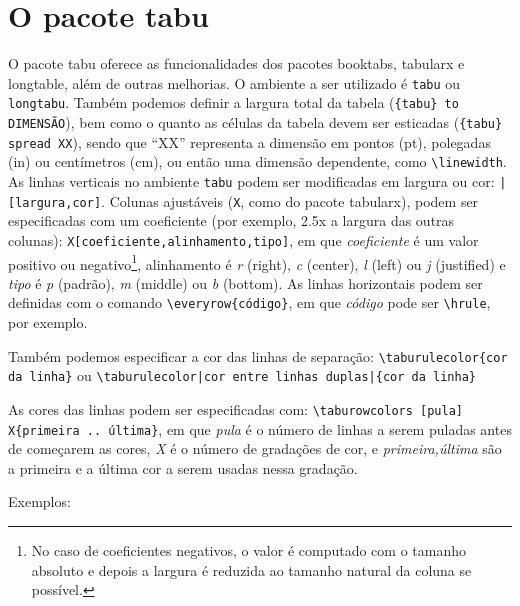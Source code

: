 \documentclass{article}
\begin{document}
\section{O pacote \textsf{tabu}}
\label{sec:tabu}

O pacote \textsf{tabu} oferece as funcionalidades dos pacotes \textsf{booktabs}, \textsf{tabularx} e \textsf{longtable}, além de outras melhorias. O ambiente a ser utilizado é \texttt{tabu} ou \texttt{longtabu}. Também podemos definir a largura total da tabela (\verb+{tabu} to DIMENSÃO+), bem como o quanto as células da tabela devem ser esticadas (\verb+{tabu} spread XX+), sendo que ``XX'' representa a dimensão em pontos (pt), polegadas (in) ou centímetros (cm), ou então uma dimensão dependente, como \verb+\linewidth+. As linhas verticais no ambiente \texttt{tabu} podem ser modificadas em largura ou cor: \verb+|[largura,cor]+. Colunas ajustáveis (\texttt{X}, como do pacote \textsf{tabularx}), podem ser especificadas com um coeficiente (por exemplo, 2.5x a largura das outras colunas): \verb+X[coeficiente,alinhamento,tipo]+, em que \textit{coeficiente} é um valor positivo ou negativo\footnote{No caso de coeficientes negativos, o valor é computado com o tamanho absoluto e depois a largura é reduzida ao tamanho natural da coluna se possível.}, alinhamento é \textit{r} (right), \textit{c} (center), \textit{l} (left) ou \textit{j} (justified) e \textit{tipo} é \textit{p} (padrão), \textit{m} (middle) ou \textit{b} (bottom). As linhas horizontais podem ser definidas com o comando \verb+\everyrow{código}+, em que \textit{código} pode ser \verb+\hrule+, por exemplo. %

Também podemos especificar a cor das linhas de separação: \verb+\taburulecolor{cor da linha}+ ou \verb+\taburulecolor|cor entre linhas duplas|{cor da linha}+

As cores das linhas podem ser especificadas com: \verb+\taburowcolors [pula] X{primeira .. última}+, em que \textit{pula} é o número de linhas a serem puladas antes de começarem as cores, \textit{X} é o número de gradações de cor, e \textit{primeira,última} são a primeira e a última cor a serem usadas nessa gradação.

Exemplos:
\end{document}
